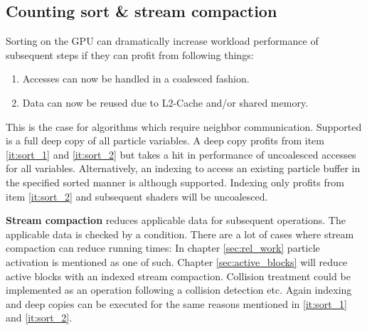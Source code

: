 \documentclass[m,times]{cgMA}
\begin{document}
\subsection{Counting sort \& stream compaction}\label{sec:sort}
Sorting on the GPU can dramatically increase workload performance of subsequent steps if they can profit from following things:
\begin{enumerate}
  \item Accesses can now be handled in a coalesced fashion. \label{it:sort_1}
  \item Data can now be reused due to L2-Cache and/or shared memory. \label{it:sort_2}
\end{enumerate}
This is the case for algorithms which require neighbor communication. Supported is a full deep copy of all particle variables. A deep copy profits from item \ref{it:sort_1} and \ref{it:sort_2} but takes a hit in performance of uncoalesced accesses for all variables. Alternatively, an indexing to access an existing particle buffer in the specified sorted manner is although supported. Indexing only profits from item \ref{it:sort_2} and subsequent shaders will be uncoalesced.

\textbf{Stream compaction} reduces applicable data for subsequent operations. The applicable data is checked by a condition. There are a lot of cases where stream compaction can reduce running times: In chapter \ref{sec:rel_work} particle activation is mentioned as one of such. Chapter \ref{sec:active_blocks} will reduce active blocks with an indexed stream compaction. Collision treatment could be implemented as an operation following a collision detection etc. Again indexing and deep copies can be executed for the same reasons mentioned in \ref{it:sort_1} and \ref{it:sort_2}.
\end{document}
